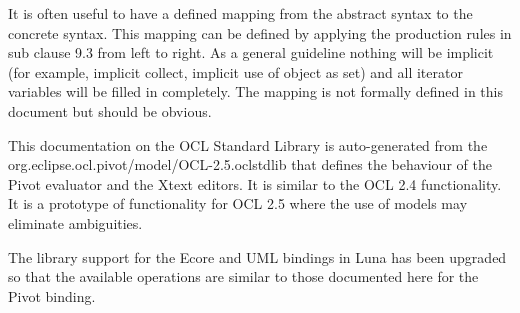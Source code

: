 \documentclass{scrreprt}   %
\begin{document}
It is often useful to have a defined mapping from the abstract syntax to the concrete syntax. This mapping can be defined
by applying the production rules in sub clause 9.3 from left to right. As a general guideline nothing will be implicit (for
example, implicit collect, implicit use of object as set) and all iterator variables will be filled in completely. The mapping
is not formally defined in this document but should be obvious.

\label{ocl:EvaluationSemantics}


This documentation on the OCL Standard Library is auto-generated from the
org.eclipse.ocl.pivot/model/OCL-2.5.oclstdlib that defines
the behaviour of the Pivot evaluator and the Xtext editors. It is similar to the OCL 2.4 functionality.
It is a prototype of functionality for OCL 2.5 where the use of models may eliminate ambiguities.
		
The library support for the Ecore and UML bindings in Luna has been upgraded so that the available operations
are similar to those documented here for the Pivot binding.





\end{document}
